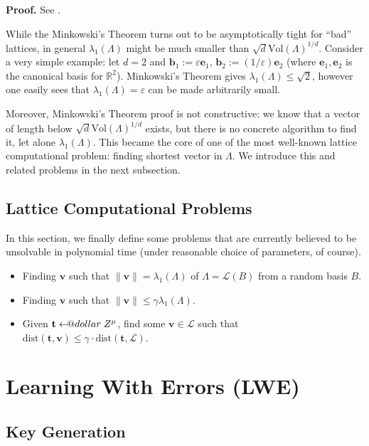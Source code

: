 \documentclass{template}
\makeatletter
\newcommand\leftarrowS{\leftarrow\joinrel\smalldollar}
\newcommand{\smalldollar}{\mathrel{\mathpalette\small@dollar\relax}}
\newcommand{\small@dollar}[2]{%
  \vcenter{\hbox{%
    $#1\textnormal{\fontsize{0.7\dimexpr\f@size pt}{0}\selectfont\$}$%
  }}%
}
\makeatother
\begin{document}
\textbf{Proof.} See \cite[Section 1.3]{complexity-goldwasser}.

While the Minkowski's Theorem turns out to be asymptotically tight for ``bad''
lattices, in general $\lambda_1(\Lambda)$ might be much smaller than
$\sqrt{d}\text{Vol}(\Lambda)^{1/d}$. Consider a very simple example: let $d=2$
and $\mathbf{b}_1 := \varepsilon \mathbf{e}_1$, $\mathbf{b}_2 :=
(1/\varepsilon)\mathbf{e}_2$ (where $\mathbf{e}_1,\mathbf{e}_2$ is the canonical
basis for $\mathbb{R}^2$). Minkowski's Theorem gives $\lambda_1(\Lambda) \leq
\sqrt{2}$, however one easily sees that $\lambda_1(\Lambda) = \varepsilon$ can
be made arbitrarily small.

Moreover, Minkowski's Theorem proof is not constructive: we know that a vector
of length below $\sqrt{d}\text{Vol}(\Lambda)^{1/d}$ exists, but there is no
concrete algorithm to find it, let alone $\lambda_1(\Lambda)$. This became the
core of one of the most well-known lattice computational problem: finding
shortest vector in $\Lambda$. We introduce this and related problems in the next
subsection.

\subsection{Lattice Computational Problems}

In this section, we finally define some problems that are currently believed to
be unsolvable in polynomial time (under reasonable choice of parameters, of
course). 

\begin{itemize}
    \item Finding $\mathbf{v}$ such that $\|\mathbf{v}\| = \lambda_1(\Lambda)$
    of $\Lambda = \mathcal{L}(B)$ from a random basis $B$.
    \item Finding $\mathbf{v}$ such that $\|\mathbf{v}\| \leq
    \gamma\lambda_1(\Lambda)$.
    \item Given $\mathbf{t} \leftarrowS \mathbb{Z}^{\mu}$, find some $\mathbf{v}
    \in \mathcal{L}$ such that $\text{dist}(\mathbf{t}, \mathbf{v}) \leq \gamma
    \cdot \text{dist}(\mathbf{t}, \mathcal{L})$.
\end{itemize}

\section{Learning With Errors (LWE)}\label{section:lwe}

\subsection{Key Generation}
\end{document}
